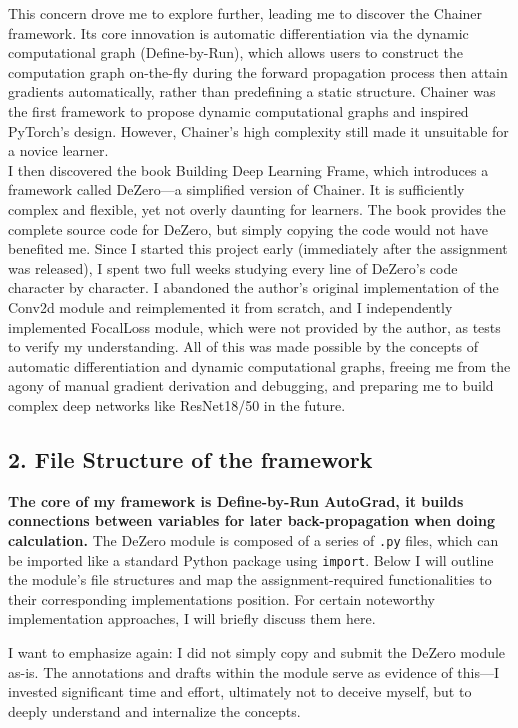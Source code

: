 \documentclass{article}
\newcommand{\subs}[1]{\subsection*{#1}}
\begin{document}
This concern drove me to explore further, leading me to discover the Chainer framework. Its core innovation is automatic differentiation via the dynamic computational graph (Define-by-Run), which allows users to construct the computation graph on-the-fly during the forward propagation process then attain gradients automatically, rather than predefining a static structure. Chainer was the first framework to propose dynamic computational graphs and inspired PyTorch's design. However, Chainer's high complexity still made it unsuitable for a novice learner.\\

I then discovered the book Building Deep Learning Frame, which introduces a framework called DeZero—a simplified version of Chainer. It is sufficiently complex and flexible, yet not overly daunting for learners. The book provides the complete source code for DeZero, but simply copying the code would not have benefited me. Since I started this project early (immediately after the assignment was released), I spent two full weeks studying every line of DeZero's code character by character. I abandoned the author’s original implementation of the Conv2d module and reimplemented it from scratch, and I independently implemented FocalLoss module, which were not provided by the author, as tests to verify my understanding. All of this was made possible by the concepts of automatic differentiation and dynamic computational graphs, freeing me from the agony of manual gradient derivation and debugging, and preparing me to build complex deep networks like ResNet18/50 in the future.

\subs{2. File Structure of the framework}
\textbf{The core of my framework is Define-by-Run AutoGrad, it builds connections between variables for later back-propagation when doing calculation.} The DeZero module is composed of a series of \texttt{.py} files, which can be imported like a standard Python package using \texttt{import}. Below I will outline the module's file structures and map the assignment-required functionalities to their corresponding implementations position. For certain noteworthy implementation approaches, I will briefly discuss them here.

I want to emphasize again: I did not simply copy and submit the DeZero module as-is. The annotations and drafts within the module serve as evidence of this—I invested significant time and effort, ultimately not to deceive myself, but to deeply understand and internalize the concepts.
\end{document}
